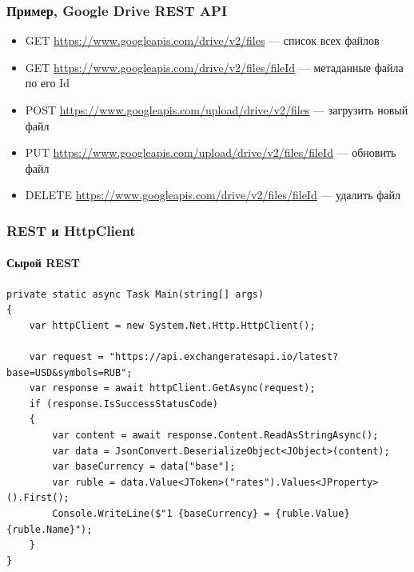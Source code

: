 \documentclass[xetex,mathserif,serif]{beamer}
\begin{document}
	\begin{frame}
		\frametitle{Пример, Google Drive REST API}
		\begin{itemize}
			\item GET \url{https://www.googleapis.com/drive/v2/files} --- список всех файлов
			\item GET \url{https://www.googleapis.com/drive/v2/files/fileId} --- метаданные файла по его Id
			\item POST \url{https://www.googleapis.com/upload/drive/v2/files} — загрузить новый файл
			\item PUT \url{https://www.googleapis.com/upload/drive/v2/files/fileId} --- обновить файл
			\item DELETE \url{https://www.googleapis.com/drive/v2/files/fileId} --- удалить файл
		\end{itemize}
	\end{frame}

	\begin{frame}[fragile]
		\frametitle{REST и HttpClient}
		\framesubtitle{Сырой REST}
		\begin{footnotesize}
			\begin{verbatim}
private static async Task Main(string[] args)
{
    var httpClient = new System.Net.Http.HttpClient();

    var request = "https://api.exchangeratesapi.io/latest?base=USD&symbols=RUB";
    var response = await httpClient.GetAsync(request);
    if (response.IsSuccessStatusCode)
    {
        var content = await response.Content.ReadAsStringAsync();
        var data = JsonConvert.DeserializeObject<JObject>(content);
        var baseCurrency = data["base"];
        var ruble = data.Value<JToken>("rates").Values<JProperty>().First();
        Console.WriteLine($"1 {baseCurrency} = {ruble.Value} {ruble.Name}");
    }
}
			\end{verbatim}
		\end{footnotesize}
	\end{frame}
\end{document}
